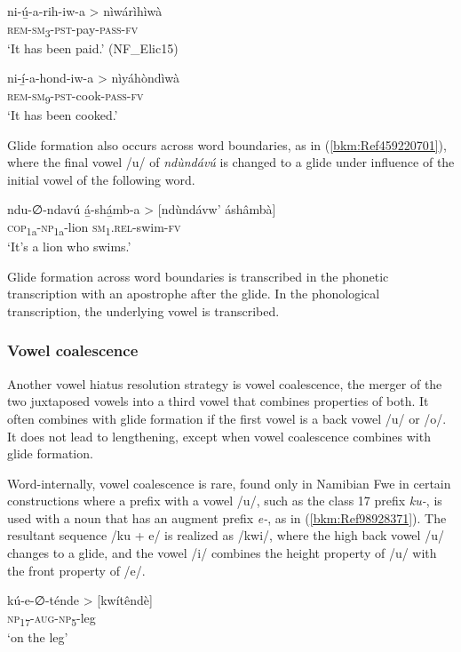 \ea
\label{bkm:Ref98928123}
ni-ú̲-a-rih-iw-a > nìwárìhìwà\\
\textsc{rem}-\textsc{sm}\textsubscript{3}-\textsc{pst}-pay-\textsc{pass}-\textsc{fv}\\
\glt ‘It has been paid.’ (NF\_Elic15)
\z

\ea
\label{bkm:Ref98928138}
ni-í̲-a-hond-iw-a > nìyáhòndìwà\\
\textsc{rem}-\textsc{sm}\textsubscript{9}-\textsc{pst}-cook-\textsc{pass}-\textsc{fv}\\
\glt ‘It has been cooked.’
\z

Glide formation also occurs across word boundaries, as in (\ref{bkm:Ref459220701}), where the final vowel /u/ of \textit{ndùndávú} is changed to a glide under influence of the initial vowel of the following word.

\ea
\label{bkm:Ref459220701}
\gll ndu-∅-ndavú  á̲-shá̲mb-a > [ndùndávw’ áshâmbà]\\
\textsc{cop}\textsubscript{1a}-\textsc{np}\textsubscript{1a}-lion  \textsc{sm}\textsubscript{1}.\textsc{rel}-swim-\textsc{fv}\\
\glt ‘It’s a lion who swims.’
\z

Glide formation across word boundaries is transcribed in the phonetic transcription with an apos\-trophe after the glide. In the phonological transcription, the underlying vowel is transcribed.

\subsubsection{Vowel coalescence}

Another vowel hiatus resolution strategy is vowel coalescence, the merger of the two juxtaposed vowels into a third vowel that combines properties of both. It often combines with glide formation if the first vowel is a back vowel /u/ or /o/. It does not lead to lengthening, except when vowel coalescence com\-bines with glide formation.

Word-internally, vowel coalescence is rare, found only in Namibian Fwe in certain construc\-tions where a prefix with a vowel /u/, such as the class 17 prefix \textit{ku-}, is used with a noun that has an augment prefix \textit{e-}, as in (\ref{bkm:Ref98928371}). The resultant sequence /ku + e/ is realized as /kwi/, where the high back vowel /u/ changes to a glide, and the vowel /i/ combines the height property of /u/ with the front property of /e/.

\ea
\label{bkm:Ref98928371}
kú-e-∅-ténde > [kwítêndè]\\
\textsc{np}\textsubscript{17}-\textsc{aug}-\textsc{np}\textsubscript{5}-leg\\
\glt ‘on the leg’
\z


